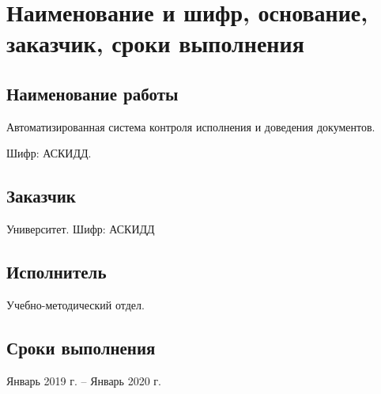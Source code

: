 \documentclass[russian]{eskdtext}
\begin{document}
\maketitle


\tableofcontents
\newpage

\section{Наименование и шифр, основание, заказчик, сроки выполнения}
\subsection{Наименование работы}
Автоматизированная система контроля исполнения и доведения документов.

Шифр: АСКИДД.

\subsection{Заказчик}
Университет.
\newline
Шифр: АСКИДД

\subsection{Исполнитель}
Учебно-методический отдел.

\subsection{Сроки выполнения}
Январь 2019 г. -- Январь 2020 г.
\end{document}
